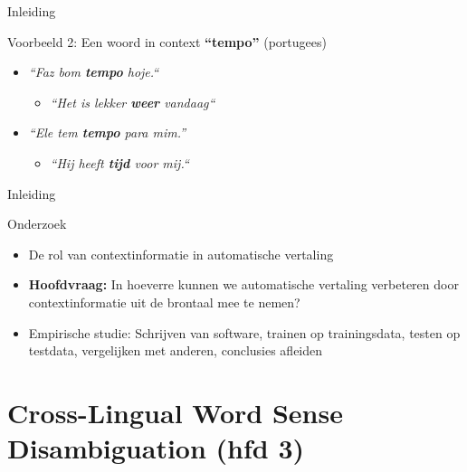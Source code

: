 \documentclass[8pt]{beamer}
\begin{document}
\begin{frame}{Inleiding}

    \begin{block}{Voorbeeld 2: Een woord in context}
        {\Large\textbf{``tempo''}} (portugees)
        \begin{itemize}
            \item \emph{``Faz bom \textbf{tempo} hoje.``}
            \begin{itemize}
                \item \emph{``Het is lekker \textbf{weer} vandaag``}
            \end{itemize}
            \item \emph{``Ele tem \textbf{tempo} para mim.''}
            \begin{itemize}
                \item \emph{``Hij heeft \textbf{tijd} voor mij.``}
            \end{itemize}
        \end{itemize}
    \end{block}

\end{frame}

\begin{frame}{Inleiding}

	\begin{block}{Onderzoek}
        \begin{itemize}
            \item De rol van contextinformatie in automatische vertaling
            \item \textbf{Hoofdvraag:} In hoeverre kunnen we automatische vertaling verbeteren door contextinformatie uit de brontaal mee te nemen?
            \item Empirische studie: Schrijven van software, trainen op trainingsdata, testen op testdata,
                vergelijken met anderen, conclusies afleiden
        \end{itemize}
	\end{block}

\end{frame}


\section{Cross-Lingual Word Sense Disambiguation (hfd 3)}
\end{document}
